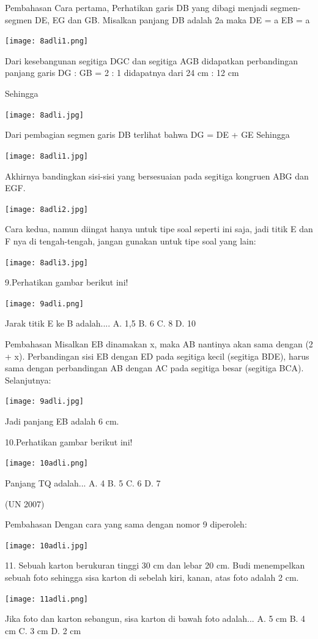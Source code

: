 \documentclass[11pt,fleqn]{book} %
\begin{document}
Pembahasan
Cara pertama,
Perhatikan garis DB yang dibagi menjadi segmen-segmen DE, EG dan GB. 
Misalkan 
panjang DB adalah 2a 
maka 
DE = a 
EB = a 

\texttt{[image: 8adli1.png]}

Dari kesebangunan segitiga DGC dan segitiga AGB didapatkan perbandingan panjang garis
DG : GB = 2 : 1  didapatnya  dari 24 cm : 12 cm

Sehingga

\texttt{[image: 8adli.jpg]}

Dari pembagian segmen garis DB terlihat bahwa
DG = DE + GE
Sehingga

\texttt{[image: 8adli1.jpg]}

Akhirnya bandingkan sisi-sisi yang bersesuaian pada segitiga kongruen ABG dan EGF. 

\texttt{[image: 8adli2.jpg]}

Cara kedua,  namun diingat hanya untuk tipe soal seperti ini saja, jadi titik E dan F nya di tengah-tengah, jangan gunakan untuk tipe soal yang lain: 

\texttt{[image: 8adli3.jpg]}

9.Perhatikan gambar berikut ini! 

\texttt{[image: 9adli.png]}

Jarak titik E ke B adalah....
A. 1,5
B. 6
C. 8
D. 10 

Pembahasan
Misalkan EB dinamakan x, maka AB nantinya akan sama dengan (2 + x). Perbandingan sisi EB dengan ED pada segitiga kecil (segitiga BDE), harus sama dengan perbandingan AB dengan AC pada segitiga besar (segitiga BCA). Selanjutnya: 

\texttt{[image: 9adli.jpg]}
 
Jadi panjang EB adalah 6 cm.

10.Perhatikan gambar berikut ini! 

\texttt{[image: 10adli.png]}

Panjang TQ adalah...
A. 4
B. 5
C. 6
D. 7

(UN 2007) 

Pembahasan
Dengan cara yang sama dengan nomor 9 diperoleh: 

\texttt{[image: 10adli.jpg]}

11. Sebuah karton berukuran tinggi 30 cm dan lebar 20 cm. Budi menempelkan sebuah foto sehingga sisa karton di sebelah kiri, kanan, atas foto adalah 2 cm.

\texttt{[image: 11adli.png]}

Jika foto dan karton sebangun, sisa karton di bawah foto adalah...
A. 5 cm 
B. 4 cm 
C. 3 cm 
D. 2 cm 
\end{document}
